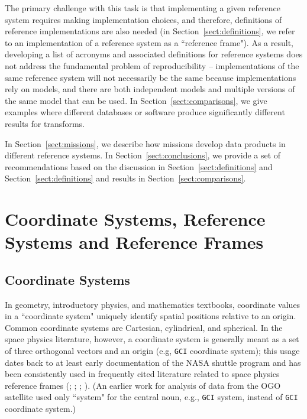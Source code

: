 \documentclass[draft]{agujournal2019}
\begin{document}
The primary challenge with this task is that implementing a given reference system requires making implementation choices, and therefore, definitions of reference implementations are also needed (in Section~\ref{sect:definitions}, we refer to an implementation of a reference system as a ``reference frame"). As a result, developing a list of acronyms and associated definitions for reference systems does not address the fundamental problem of reproducibility -- implementations of the same reference system will not necessarily be the same because implementations rely on models, and there are both independent models and multiple versions of the same model that can be used. In Section~\ref{sect:comparisons}, we give examples where different databases or software produce significantly different results for transforms. 

In Section~\ref{sect:missions}, we describe how missions develop data products in different reference systems. In Section~\ref{sect:conclusions}, we provide a set of recommendations based on the discussion in Section~\ref{sect:definitions} and Section~\ref{sect:definitions} and results in Section~\ref{sect:comparisons}.

\section{Coordinate Systems, Reference Systems and Reference Frames}
\label{sect:terminology}


\subsection{Coordinate Systems}

In geometry, introductory physics, and mathematics textbooks, coordinate values in a ``coordinate system" uniquely identify spatial positions relative to an origin. Common coordinate systems are Cartesian, cylindrical, and spherical. In the space physics literature, however, a coordinate system is generally meant as a set of three orthogonal vectors and an origin (e.g, \texttt{GCI} coordinate system); this usage dates back to at least early documentation of the NASA shuttle program \cite{Davis1974} and has been consistently used in frequently cited literature related to space physics reference frames (; ; ; ). (An earlier work for analysis of data from the OGO satellite used only ``system" for the central noun, e.g., \texttt{GCI} system, instead of \texttt{GCI} coordinate system.)
\end{document}
